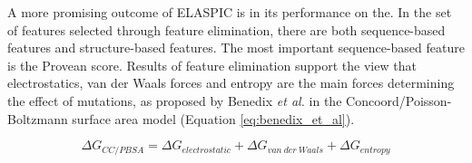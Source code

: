 A more promising outcome of ELASPIC is in its performance on the. In the set of features selected through feature elimination, there are both sequence-based features and structure-based features. The most important sequence-based feature is the Provean score. Results of feature elimination support the view that electrostatics, van der Waals forces and entropy are the main forces determining the effect of mutations, as proposed by Benedix \textit{et al.} in the Concoord/Poisson-Boltzmann surface area model (Equation \ref{eq:benedix_et_al}).

\begin{equation} \label{eq:benedix_et_al}
    \Delta G_{CC/PBSA} = \Delta G_{electrostatic} + \Delta G_{van\ der\ Waals} + \Delta G_{entropy}
\end{equation}
